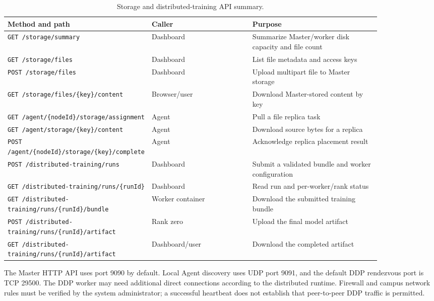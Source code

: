 \documentclass{article}
\begin{document}
\begin{table}[h!]
\centering
\caption{Storage and distributed-training API summary.}
\label{tab:api-storage}
\begin{tabular}{|p{0.22\linewidth}|p{0.28\linewidth}|p{0.36\linewidth}|}
\hline
Method and path & Caller & Purpose \\
\hline
\texttt{GET /storage/summary} & Dashboard & Summarize Master/worker disk capacity and file count \\
\hline
\texttt{GET /storage/files} & Dashboard & List file metadata and access keys \\
\hline
\texttt{POST /storage/files} & Dashboard & Upload multipart file to Master storage \\
\hline
\texttt{GET /storage/files/\{key\}/content} & Browser/user & Download Master-stored content by key \\
\hline
\texttt{GET /agent/\{nodeId\}/storage/assignment} & Agent & Pull a file replica task \\
\hline
\texttt{GET /agent/storage/\{key\}/content} & Agent & Download source bytes for a replica \\
\hline
\texttt{POST /agent/\{nodeId\}/storage/\{key\}/complete} & Agent & Acknowledge replica placement result \\
\hline
\texttt{POST /distributed-training/runs} & Dashboard & Submit a validated bundle and worker configuration \\
\hline
\texttt{GET /distributed-training/runs/\{runId\}} & Dashboard & Read run and per-worker/rank status \\
\hline
\texttt{GET /distributed-training/runs/\{runId\}/bundle} & Worker container & Download the submitted training bundle \\
\hline
\texttt{POST /distributed-training/runs/\{runId\}/artifact} & Rank zero & Upload the final model artifact \\
\hline
\texttt{GET /distributed-training/runs/\{runId\}/artifact} & Dashboard/user & Download the completed artifact \\
\hline
\end{tabular}
\end{table}

The Master HTTP API uses port 9090 by default. Local Agent discovery uses UDP port 9091, and the default DDP rendezvous port is TCP 29500. The DDP worker may need additional direct connections according to the distributed runtime. Firewall and campus network rules must be verified by the system administrator; a successful heartbeat does not establish that peer-to-peer DDP traffic is permitted.
\end{document}

